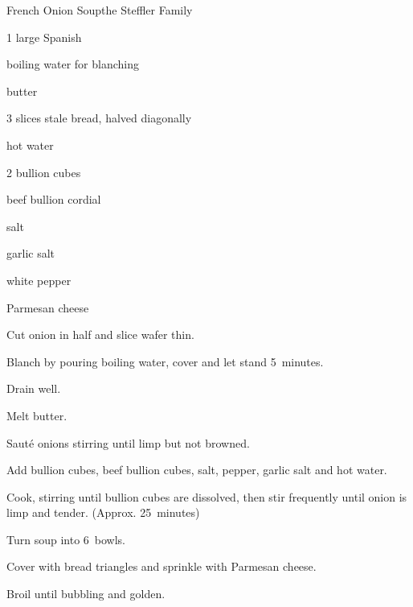 \begin{recipe}{French Onion Soup}{the Steffler Family}{}

\begin{ingredients}
\item 1 large Spanish 
\item boiling water for blanching
\item \C{\quarter} butter
\item 3 slices stale bread, halved diagonally
\item {} hot water
\item 2 bullion cubes
\item \C{\quarter} beef bullion cordial
\item {} salt
\item \tp{\eighth} garlic salt
\item \tp{\eighth} white pepper
\item \C{\half} Parmesan cheese
\end{ingredients}

\begin{directions}
\item Cut onion in half and slice wafer thin.
\item Blanch by pouring boiling water, cover and let stand 5~minutes.
\item Drain well.
\item Melt butter.
\item Saut\'e onions stirring until limp but not browned.
\item Add bullion cubes, beef bullion cubes, salt, pepper, garlic salt and hot water.
\item Cook, stirring until bullion cubes are dissolved, then stir frequently until onion is limp and tender. (Approx. 25~minutes)
\item Turn soup into 6~bowls.
\item Cover with bread triangles and sprinkle with Parmesan cheese.
\item Broil until bubbling and golden.
\end{directions}
\end{recipe}
